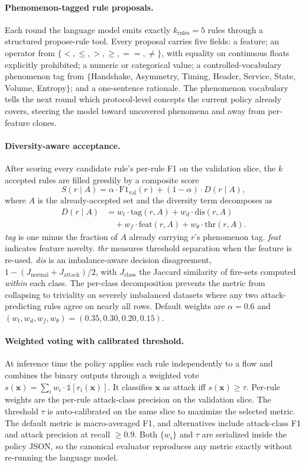 \paragraph{Phenomenon-tagged rule proposals.}
Each round the language model emits exactly $k_{\text{rules}}=5$ rules through
a structured propose-rule tool. Every proposal carries five fields: a feature;
an operator from $\{<, \leq, >, \geq, ==, \neq\}$, with equality on continuous
floats explicitly prohibited; a numeric or categorical value; a
controlled-vocabulary phenomenon tag from
$\{$Handshake, Asymmetry, Timing, Header, Service, State, Volume, Entropy$\}$;
and a one-sentence rationale. The phenomenon vocabulary tells the next round
which protocol-level concepts the current policy already covers, steering the
model toward uncovered phenomena and away from per-feature clones.

\paragraph{Diversity-aware acceptance.}
After scoring every candidate rule's per-rule F1 on the validation slice, the
$k$ accepted rules are filled greedily by a composite score
\[
  S(r \mid A) = \alpha \cdot \mathrm{F1}_{\text{val}}(r)
  + (1 - \alpha) \cdot D(r \mid A),
\]
where $A$ is the already-accepted set and the diversity term decomposes as
\[
\begin{aligned}
D(r \mid A) &= w_t \cdot \mathrm{tag}(r,A)
  + w_d \cdot \mathrm{dis}(r,A) \\
&\quad + w_f \cdot \mathrm{feat}(r,A)
  + w_\theta \cdot \mathrm{thr}(r,A).
\end{aligned}
\]
\textit{tag} is one minus the fraction of $A$ already carrying $r$'s
phenomenon tag. \textit{feat} indicates feature novelty. \textit{thr}
measures threshold separation when the feature is re-used. \textit{dis} is an
imbalance-aware decision disagreement,
$1 - (J_{\text{normal}} + J_{\text{attack}})/2$, with $J_{\text{class}}$ the
Jaccard similarity of fire-sets computed \emph{within} each class. The
per-class decomposition prevents the metric from collapsing to triviality on
severely imbalanced datasets where any two attack-predicting rules agree on
nearly all rows. Default weights are $\alpha = 0.6$ and
$(w_t, w_d, w_f, w_\theta) = (0.35, 0.30, 0.20, 0.15)$.

\paragraph{Weighted voting with calibrated threshold.}
At inference time the policy applies each rule independently to a flow and
combines the binary outputs through a weighted vote
$s(\mathbf{x}) = \sum_i w_i \cdot \mathbb{1}[r_i(\mathbf{x})]$. It classifies
$\mathbf{x}$ as attack iff $s(\mathbf{x}) \geq \tau$. Per-rule weights are the
per-rule attack-class precision on the validation slice. The threshold $\tau$
is auto-calibrated on the same slice to maximize the selected metric. The
default metric is macro-averaged F1, and alternatives include attack-class F1
and attack precision at recall $\geq 0.9$. Both $\{w_i\}$ and $\tau$ are
serialized inside the policy JSON, so the canonical evaluator reproduces any
metric exactly without re-running the language model.

